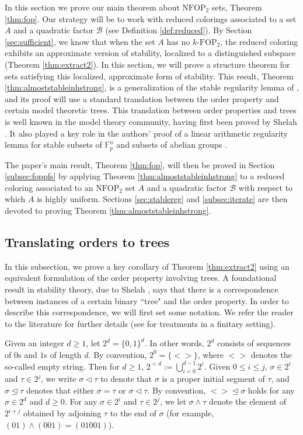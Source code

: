 \documentclass[12pt,oneside,british,a4wide]{amsart}
\numberwithin{equation}{section}
\theoremstyle{definition}
\def\F{\mathbb{F}}
\def\FOP{\mathrm{FOP}}
\def\NFOP{\mathrm{NFOP}}
\newcommand{\calB}{\mathcal{B}}
\begin{document}
In this section we prove our main theorem about $\NFOP_2$ sets, Theorem \ref{thm:fop}.  Our strategy will be to work with reduced colorings associated to a set $A$ and a quadratic factor $\calB$ (see Definition \ref{def:reduced}).  By Section \ref{sec:sufficient}, we know that when the set $A$ has no $k$-$\FOP_2$,  the reduced coloring exhibits an approximate version of stability, localized to a distinguished subspace (Theorem \ref{thm:extract2}).  In this section, we will prove a structure theorem for sets satisfying this localized, approximate  form of stability. This result, Theorem \ref{thm:almoststableinhstrong}, is a generalization of the stable regularity lemma of \cite{Terry.2019}, and its proof will use a standard translation between the order property and  certain model theoretic trees. This translation between order properties and trees is well known in the model theory community, having first been proved by Shelah \cite{Shelah.1990o5n}. It  also played a key role in the authors' proof of a linear arithmetic regularity lemma for stable subsets of $\F_p^n$ \cite{Terry.2019} and subsets of abelian groups \cite{Terry.2020}. 

The paper's main result, Theorem \ref{thm:fop}, will then be proved in Section \ref{subsec:foppfs} by applying Theorem \ref{thm:almoststableinhstrong} to a reduced coloring associated to an $\NFOP_2$ set $A$ and a quadratic factor $\calB$ with respect to which $A$ is highly uniform.  Sections \ref{sec:stablereg} and  \ref{subsec:iterate} are then devoted to proving Theorem \ref{thm:almoststableinhstrong}.

\subsection{Translating orders to trees}\label{ss:trees}

In this subsection, we prove a key corollary of Theorem \ref{thm:extract2} using an equivalent formulation of the order property involving trees.  A foundational result in stability theory, due to Shelah \cite{Shelah.1990o5n}, says that there is a correspondence between instances of a certain binary ``tree" and the order property.  In order to describe this correspondence, we will first set some notation. We refer the reader to the literature for further details (see \cite{Hodges.1981, Malliaris.2014, Terry.2019} for treatments in a finitary setting). 

Given an integer $d\geq 1$, let $2^d=\{0,1\}^d$.  In other words, $2^d$ consists of sequences of $0$s and $1$s of length $d$.  By convention, $2^0=\{<>\}$, where $<>$ denotes the so-called empty string.  Then for $d\geq 1$, $2^{<d}:=\bigcup_{i=0}^{d-1}2^i$.  Given $0\leq i\leq j$, $\sigma\in 2^i$ and $\tau\in 2^j$, we write $\sigma \triangleleft \tau$ to denote that $\sigma$ is a proper initial segment of $\tau$, and $\sigma\trianglelefteq \tau$ denotes that either $\sigma=\tau$ or $\sigma\triangleleft \tau$.  By convention, $<>\trianglelefteq \sigma$ holds for any $\sigma\in 2^d$ and $d\geq 0$.  For any $\sigma \in 2^i$ and $\tau\in 2^j$, we let $\sigma \wedge \tau$ denote the element of $2^{i+j}$ obtained by adjoining $\tau$ to the end of $\sigma$ (for example, $(01)\wedge (001)=(01001)$). 
\end{document}
